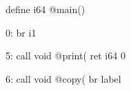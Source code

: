 define i64 @main() {
0:
	br i1 %

5:
	call void @print(%
	ret i64 0

6:
	call void @copy(%
	br label %
}